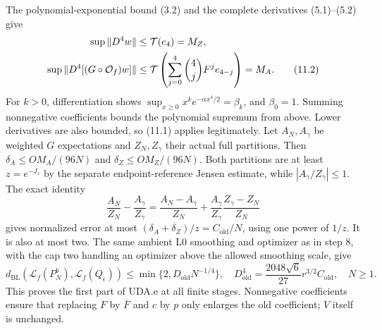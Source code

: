 \documentclass[11pt]{article}
\theoremstyle{plain}
\theoremstyle{definition}
\theoremstyle{remark}
\begin{document}
The polynomial-exponential bound (3.2) and the complete derivatives
(5.1)--(5.2) give
\begin{align}
 \sup\|D^4w\|&\le\mathcal T(e_4)=M_Z,\notag\\
 \sup\|D^4[(G\circ\mathcal O_f)w]\|
 &\le\mathcal T\left(\sum_{j=0}^4\binom4jF^je_{4-j}\right)=M_A.\tag{11.2}
\end{align}
For $k>0$, differentiation shows
$\sup_{x\ge0}x^ke^{-\alpha x^4/2}=\beta_k$, and $\beta_0=1$.
Summing nonnegative coefficients bounds the polynomial supremum from above.
Lower derivatives are also bounded, so (11.1) applies legitimately.
Let $A_N,A_\gamma$ be weighted $G$ expectations and $Z_N,Z_\gamma$ their
actual full partitions. Then $\delta_A\le OM_A/(96N)$ and
$\delta_Z\le OM_Z/(96N)$. Both partitions are at least
$z=e^{-J_z}$ by the separate endpoint-reference Jensen estimate, while
$|A_\gamma/Z_\gamma|\le1$. The exact identity
\[
 \frac{A_N}{Z_N}-\frac{A_\gamma}{Z_\gamma}
 =\frac{A_N-A_\gamma}{Z_N}
 +\frac{A_\gamma}{Z_\gamma}\frac{Z_\gamma-Z_N}{Z_N}
\]
gives normalized error at most $(\delta_A+\delta_Z)/z=C_{\mathrm{old}}/N$,
using one power of $1/z$. It is also at most two. The same ambient L0
smoothing and optimizer as in step 8, with the cap two handling an
optimizer above the allowed smoothing scale, give
\begin{equation}
 d_{\mathrm{BL}}(\mathcal L_f(P_N^b),\mathcal L_f(Q_\epsilon))
 \le\min\{2,D_{\mathrm{old}}N^{-1/4}\},\quad
 D_{\mathrm{old}}^4=\frac{2048\sqrt6}{27}r^{3/2}C_{\mathrm{old}},
 \quad N\ge1.\tag{11.3}
\end{equation}
This proves the first part of UDA.e at all finite stages.
Nonnegative coefficients ensure that replacing $F$ by $\overline F$ and
$c$ by $p$ only enlarges the old coefficient; $V$ itself is unchanged.
\end{document}
